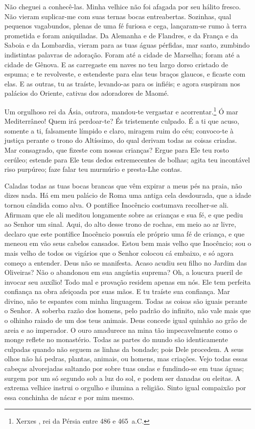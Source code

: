 Não cheguei a conhecê-las. Minha velhice não foi afagada por seu hálito
fresco. Não vieram suplicar-me com suas ternas bocas entreabertas.
Sozinhas, qual pequenos vagabundos, plenas de uma fé furiosa e cega,
lançaram-se rumo à terra prometida e foram aniquiladas. Da Alemanha e de
Flandres, e da França e da Saboia e da Lombardia, vieram para as tuas
águas pérfidas, mar santo, zumbindo indistintas palavras de adoração.
Foram até a cidade de Marselha; foram até a cidade de Gênova. E as
carregaste em naves no teu largo dorso cristado de espuma; e te
revolveste, e estendeste para elas teus braços glaucos, e ficaste com
elas. E as outras, tu as traíste, levando-as para os infiéis; e agora
suspiram nos palácios do Oriente, cativas dos adoradores de Maomé.

Um orgulhoso rei da Ásia, outrora, mandou-te vergastar e
acorrentar.\footnote{ Xerxes , rei da Pérsia entre 486 e 465~a.C.} Ó mar
Mediterrâneo! Quem irá perdoar-te? És tristemente culpado. É a ti que
acuso, somente a ti, falsamente límpido e claro, miragem ruim do céu;
convoco-te à justiça perante o trono do Altíssimo, do qual derivam todas
as coisas criadas. Mar consagrado, que fizeste com nossas crianças? Ergue
para Ele teu rosto cerúleo; estende para Ele teus dedos estremecentes de
bolhas; agita teu incontável riso purpúreo; faze falar teu murmúrio e
presta-Lhe contas.

Caladas todas as tuas bocas brancas que vêm expirar a meus pés na praia,
não dizes nada. Há em meu palácio de Roma uma antiga cela desdourada, que
a idade tornou cândida como alva. O pontífice Inocêncio costumava
recolher-se ali. Afirmam que ele ali meditou longamente sobre as crianças
e sua fé, e que pediu ao Senhor um sinal. Aqui, do alto desse trono de
rochas, em meio ao ar livre, declaro que este pontífice Inocêncio possuía
ele próprio uma fé de criança, e que meneou em vão seus cabelos cansados.
Estou bem mais velho que Inocêncio; sou o mais velho de todos os vigários
que o Senhor colocou cá embaixo, e só agora começo a entender. Deus não se
manifesta. Acaso acudiu seu filho no Jardim das Oliveiras? Não o abandonou
em sua angústia suprema? Oh, a loucura pueril de invocar seu auxílio! Todo
mal e provação residem apenas em nós. Ele tem perfeita confiança na obra
afeiçoada por suas mãos. E tu traíste sua confiança. Mar divino, não te
espantes com minha linguagem. Todas as coisas são iguais perante o Senhor.
A soberba razão dos homens, pelo padrão do infinito, não vale mais que o
olhinho raiado de um dos teus animais. Deus concede igual quinhão ao grão
de areia e ao imperador. O ouro amadurece na mina tão impecavelmente como
o monge reflete no monastério. Todas as partes do mundo são identicamente
culpadas quando não seguem as linhas da bondade; pois Dele procedem. A
seus olhos não há pedras, plantas, animais, ou homens, mas criações. Vejo
todas essas cabeças alvorejadas saltando por sobre tuas ondas e
fundindo-se em tuas águas; surgem por um só segundo sob a luz do sol, e
podem ser danadas ou eleitas. A extrema velhice instrui o orgulho e
ilumina a religião. Sinto igual compaixão por essa conchinha de nácar e
por mim mesmo.

